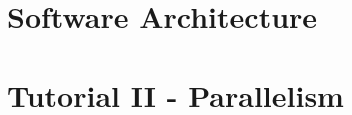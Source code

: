 
\chapter{Software Architecture}
\label{chap:sarch}



\chapter{Tutorial II - Parallelism}
\label{chap:tutorialII}
